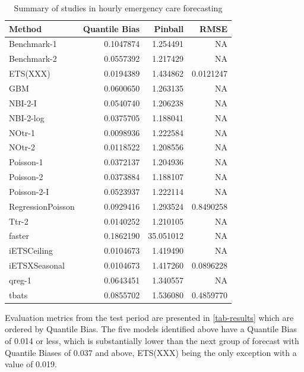 \documentclass[]{elsarticle} %
\begin{document}
\begin{table}[!h]

\caption{\label{tab:tab-results}Summary of studies in hourly emergency care forecasting}
\centering
\fontsize{11}{13}\selectfont
\begin{tabular}[t]{lrrr}
\toprule
Method & Quantile Bias & Pinball & RMSE\\
\midrule
Benchmark-1 & 0.1047874 & 1.254491 & NA\\
Benchmark-2 & 0.0557392 & 1.217429 & NA\\
ETS(XXX) & 0.0194389 & 1.434862 & 0.0121247\\
GBM & 0.0600650 & 1.263135 & NA\\
NBI-2-I & 0.0540740 & 1.206238 & NA\\
NBI-2-log & 0.0375705 & 1.188041 & NA\\
NOtr-1 & 0.0098936 & 1.222584 & NA\\
NOtr-2 & 0.0118522 & 1.208556 & NA\\
Poisson-1 & 0.0372137 & 1.204936 & NA\\
Poisson-2 & 0.0373884 & 1.188107 & NA\\
Poisson-2-I & 0.0523937 & 1.222114 & NA\\
RegressionPoisson & 0.0929416 & 1.293524 & 0.8490258\\
Ttr-2 & 0.0140252 & 1.210105 & NA\\
faster & 0.1862190 & 35.051012 & NA\\
iETSCeiling & 0.0104673 & 1.419490 & NA\\
iETSXSeasonal & 0.0104673 & 1.417260 & 0.0896228\\
qreg-1 & 0.0643451 & 1.340557 & NA\\
tbats & 0.0855702 & 1.536080 & 0.4859770\\
\bottomrule
\end{tabular}
\end{table}

Evaluation metrics from the test period are presented in \ref{tab-results} which are ordered by Quantile Bias. The five models identified above have a Quantile Bias of 0.014 or less, which is substantially lower than the next group of forecast with Quantile Biases of 0.037 and above, ETS(XXX) being the only exception with a value of 0.019.
\end{document}
